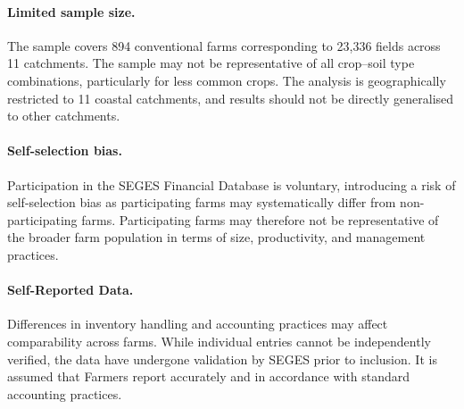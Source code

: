 \documentclass[12pt]{article}
\begin{document}
\paragraph{Limited sample size.}
The sample covers 894 conventional farms corresponding to 23,336 fields across 11 catchments. 
The sample may not be representative of all crop--soil type combinations, particularly for less common crops. 
The analysis is geographically restricted to 11 coastal catchments, and results should not be directly generalised to other catchments.


\paragraph{Self-selection bias.}
Participation in the SEGES Financial Database is voluntary, introducing a risk of self-selection bias as participating farms may systematically differ from non-participating farms. 
Participating farms may therefore not be representative of the broader farm population in terms of size, productivity, and management practices.


\paragraph{Self-Reported Data.}Differences in inventory handling and accounting practices may affect comparability across farms. While individual entries cannot be independently verified, the data have undergone validation by SEGES prior to inclusion. It is assumed that Farmers report accurately and in accordance with standard accounting practices.

\end{document}
